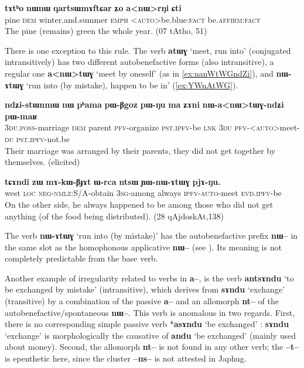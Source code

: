 \documentclass[oldfontcommands,oneside,a4paper,11pt]{article}
\newcommand{\ipa}[1]{\textbf{{\phon\mbox{#1}}}} %
\begin{document}
\begin{exe}
\ex \label{ex:anWrŋi}
\gll 
\ipa{tɤtʰo}  	\ipa{nɯnɯ}  	\ipa{qartsɯmɤftɕar}  	\ipa{ʑo}  	\ipa{a<nɯ>rŋi}  	\ipa{ɕti}  \\
pine \textsc{dem} winter.and.summer \textsc{emph} <\textsc{auto}>be.blue:\textsc{fact} be.\textsc{affirm:fact} \\
\glt The pine (remains) green the whole year. (07 tAtho, 51)
\end{exe}
 
 
 There is one exception to this rule. The verb \ipa{atɯɣ} `meet, run into' (conjugated intransitively) has two different autobenefactive forms (also intransitive), a regular one \ipa{a<nɯ>tɯɣ} `meet by oneself' (as in \ref{ex:nanWtWGndZi}), and  \ipa{nɯ-ɤtɯɣ}  `run into (by mistake), happen to be in'   (\ref{ex:YWnAtWG}).
 
 \begin{exe}
\ex \label{ex:nanWtWGndZi}
\gll 
\ipa{ndʑi-stɯnmɯ}  	\ipa{nɯ}  	\ipa{pʰama}  	\ipa{pɯ-βgoz}  	\ipa{pɯ-ŋu}  	\ipa{ma}  	\ipa{ʑɤni}  	\ipa{nɯ-a<nɯ>tɯɣ-ndʑi}  	\ipa{pɯ-maʁ}  \\
\textsc{3du.poss}-marriage \textsc{dem} parent \textsc{pfv}-organize \textsc{pst.ipfv}-be \textsc{lnk} \textsc{3du} \textsc{pfv}-<\textsc{auto}>meet-\textsc{du}  \textsc{pst.ipfv}-not.be \\
\glt Their marriage was arranged by their parents, they did not get together by themselves. (elicited)
\end{exe}

 \begin{exe}
\ex \label{ex:YWnAtWG}
\gll 
\ipa{tɕɤndi}  	\ipa{zɯ}  	\ipa{mɤ-kɯ-βɟɤt}  	\ipa{ɯ-rca}  	\ipa{ntsɯ}  	\ipa{ɲɯ-nɯ-ɤtɯɣ}  	\ipa{pjɤ-ŋu.}  \\
west \textsc{loc} \textsc{neg-nmlz}:S/A-obtain \textsc{3sg}-among always \textsc{ipfv-auto}-meet \textsc{evd.ipfv}-be \\
\glt On the other side, he always happened to be among those who did not get anything (of the food being distributed). (28 qAjdoskAt,138)
\end{exe}

The verb \ipa{nɯ-ɤtɯɣ}  `run into (by mistake)'  has the autobenefactive prefix \ipa{nɯ--} in the same slot as the homophonous applicative \ipa{nɯ--} (see \citealt{jacques13tropative}). Its meaning   is not completely predictable from the base verb.

Another example of irregularity related to verbs in \ipa{a--}, is the verb \ipa{antsɤndu} `to be exchanged by mistake' (intransitive), which derives from   \ipa{sɤndu} `exchange' (transitive) by a combination of the passive \ipa{a--} and an allomorph \ipa{nt--} of the autobenefactive/spontaneous \ipa{nɯ--}. This verb is anomalous in two regards. First, there is no corresponding simple passive verb *\ipa{asɤndu} `be exchanged' : \ipa{sɤndu} `exchange' is morphologically the causative of \ipa{andu} `be exchanged' (mainly used about money). Second, the allomorph \ipa{nt--} is not found in any other verb; the \ipa{--t--} is epenthetic here, since the cluster \ipa{--ns--} is not attested in Japhug.
\end{document}
